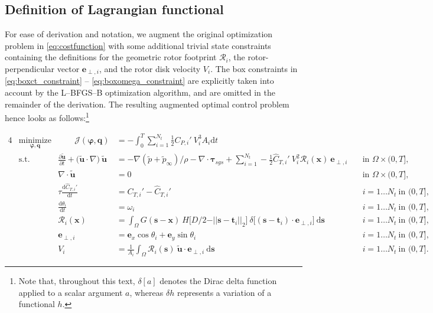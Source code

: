 \documentclass[energies,article,submit,moreauthors,latex,10pt,a4paper]{mdpi}
\newcommand{\ds}{~\text{d}\boldsymbol{s}}
\newcommand{\bs}[1]{\boldsymbol{#1}}
\newcommand{\dt}{\text{d}t}
\newcommand{\ddt}[1]{\frac{\text{d} #1}{\text{d} t}}
\newcommand{\sint}{\int_{\Omega}}
\newcommand{\Tint}{\int_{0}^{T}}
\newcommand{\utilde}{\widetilde{\bs{u}}}
\newcommand{\ptilde}{\widetilde{p}}
\newcommand{\ctihat}{\widehat{C}_{T,i}'}
\newcommand{\cti}{C_{T,i}'}
\newcommand{\R}{\mathscr{R}}
\newcommand{\J}{\mathscr{J}}
\newcommand{\eperpi}{\bs{e}_{\perp,i}}
\newcommand{\vi}{\frac{1}{A_i} \sint \R_i (\bs{s})~\utilde \cdot \eperpi \ds}
\newcommand{\diracdelta}{{\delta}}
\begin{document}
\subsection{Definition of Lagrangian functional}\label{sec:define_lagr}
\noindent For ease of derivation and notation, we augment the original optimization problem in \eqref{eq:costfunction} with some additional trivial state constraints containing the definitions for the geometric rotor footprint $\R_i$, the rotor-perpendicular vector $\eperpi$, and the rotor disk velocity $V_i$. The box constraints in \eqref{eq:boxct_constraint} -- \eqref{eq:boxomega_constraint} are explicitly taken into account by the L--BFGS--B optimization algorithm, and are omitted in the remainder of the derivation. The resulting augmented optimal control problem hence looks as follows:\footnote{Note that, throughout this text, $\delta [ a ]$ denotes the Dirac delta function applied to a scalar argument $a$, whereas $\delta h$ represents a variation of a functional $h$. }

{\small
\begin{alignat}{4}
& \underset{\bs{\varphi}, \bs{q}}{\text{minimize}}  & \qquad  \J(\bs{\varphi}, \bs{q}) &= - \Tint \sum_{i=1}^{N_t} \frac{1}{2} C_{P,i}'~V_i^3 A_i \dt  & \\
& \text{s.t.}                      			&         \frac{\partial \utilde}{\partial t} + \big(\utilde \cdot \nabla \big)~ \utilde &= - \nabla (\ptilde + \ptilde_\infty) / \rho - \nabla \cdot \boldsymbol{\tau}_{sgs} + \sum_{i=1}^{N_t} - \frac{1}{2} \ctihat~V_i^2 \R_i(\bs{x})~\eperpi \quad  & \text{in } \Omega \times (0,T], \\
&                                                   &        \nabla \cdot \utilde&=0 									        & \text{in } \Omega \times (0,T],\\
&                                                   &        \tau \ddt{\ctihat}&=\cti - \ctihat 								& i=1\dots N_t~\text{in } (0,T],\\
&                                                   &        \ddt{\theta_i}&=\omega_i											& i=1\dots N_t~\text{in } (0,T],\\
&                                                   &        \R_i(\bs{x})&= \sint G(\bs{s} - \bs{x})~H\big[D/2 - \vert\vert \bs{s} - \bs{t}_i \vert\vert_2\big]~\diracdelta \big[ (\bs{s} - \bs{t}_i)\cdot \eperpi \big] \ds											& i=1\dots N_t~\text{in } (0,T], \label{eq:rconstraint}\\
&                                                   &        \eperpi&=\bs{e}_x \cos \theta_i  + \bs{e}_y \sin \theta_i											& i=1\dots N_t~\text{in } (0,T],\\
&                                                   &        V_i&= \vi											& i=1\dots N_t~\text{in } (0,T]. \label{eq:vconstraint}
\end{alignat}
}
\end{document}
